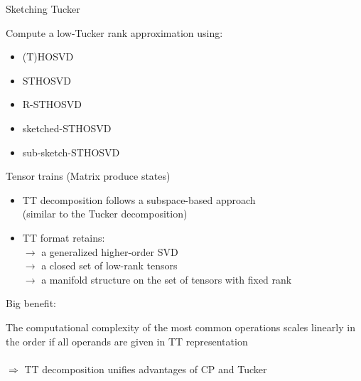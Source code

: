 \documentclass{beamer}
\newcommand{\bitem}{\item[$\bullet$]}
\begin{document}
\begin{frame}{Sketching Tucker}

Compute a low-Tucker rank approximation using:
\pause
\begin{itemize}
    \bitem (T)HOSVD \pause
    \bitem STHOSVD\pause
    \bitem R-STHOSVD\pause
    \bitem sketched-STHOSVD\pause
    \bitem sub-sketch-STHOSVD\pause
\end{itemize}
    
\end{frame}

\begin{frame}{Tensor trains (Matrix produce states)}

\begin{itemize}
    \bitem TT decomposition follows a subspace-based approach\\ 
    (similar to the Tucker decomposition) \pause
    \bitem TT format retains:\\
    $\rightarrow$ a generalized higher-order SVD\\ 
    $\rightarrow$ a closed set of low-rank tensors\\
    $\rightarrow$ a manifold structure on the set of tensors with fixed rank 
\end{itemize}
\pause
Big benefit:
\begin{center}
The computational complexity of the most common operations scales linearly in the
order if all operands are given in TT representation\\
~\\
\pause
$\Rightarrow$ TT decomposition unifies advantages of CP and Tucker
\end{center}


\end{frame}
\end{document}
